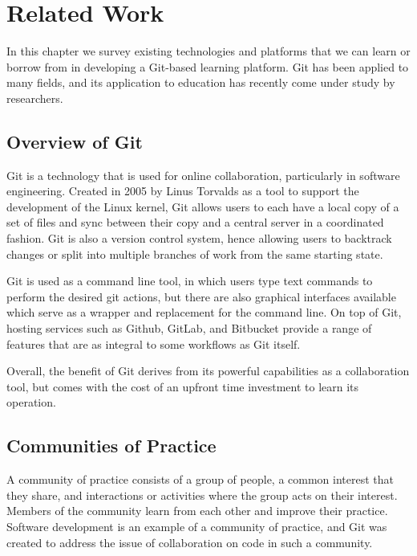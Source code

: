 \documentclass[12pt,twoside]{mitthesis}
\begin{document}
\chapter{Related Work}

In this chapter we survey existing technologies and platforms that we can learn or borrow from in developing a Git-based learning platform. Git has been applied to many fields, and its application to education has recently come under study by researchers.

\section{Overview of Git}

Git is a technology that is used for online collaboration, particularly in software engineering. Created in 2005 by Linus Torvalds as a tool to support the development of the Linux kernel, Git allows users to each have a local copy of a set of files and sync between their copy and a central server in a coordinated fashion. Git is also a version control system, hence allowing users to backtrack changes or split into multiple branches of work from the same starting state.~\cite{githistory}

Git is used as a command line tool, in which users type text commands to perform the desired git actions, but there are also graphical interfaces available which serve as a wrapper and replacement for the command line. On top of Git, hosting services such as Github, GitLab, and Bitbucket provide a range of features that are as integral to some workflows as Git itself.~\cite{githosting}

Overall, the benefit of Git derives from its powerful capabilities as a collaboration tool, but comes with the cost of an upfront time investment to learn its operation.

\section{Communities of Practice}

A community of practice consists of a group of people, a common interest that they share, and interactions or activities where the group acts on their interest. Members of the community learn from each other and improve their practice. Software development is an example of a community of practice, and Git was created to address the issue of collaboration on code in such a community.~\cite{teachingdigital}
\end{document}

